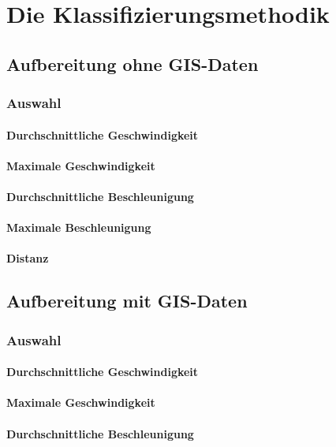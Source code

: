 \chapter{Die Klassifizierungsmethodik}


\section{Aufbereitung ohne GIS-Daten}
\subsection{Auswahl}
\subsubsection{Durchschnittliche Geschwindigkeit}
\subsubsection{Maximale Geschwindigkeit}
\subsubsection{Durchschnittliche Beschleunigung}
\subsubsection{Maximale Beschleunigung}
\subsubsection{Distanz}
\clearpage

\section{Aufbereitung mit GIS-Daten}
\subsection{Auswahl}
\subsubsection{Durchschnittliche Geschwindigkeit}
\subsubsection{Maximale Geschwindigkeit}
\subsubsection{Durchschnittliche Beschleunigung}
